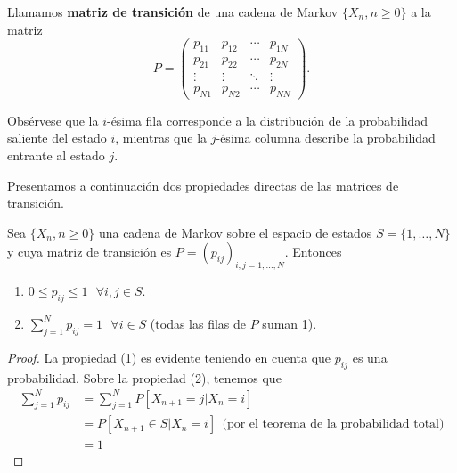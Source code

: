 \begin{definicion}
    Llamamos \textbf{matriz de transición} de una cadena de Markov $\{X_n, n\geq 0\}$ a la matriz
    \begin{equation}
        \label{eq:matriz-trans}
        P=\begin{pmatrix}
          p_{11} & p_{12} & \cdots & p_{1N} \\
          p_{21} & p_{22} & \cdots & p_{2N} \\
          \vdots & \vdots & \ddots & \vdots \\
          p_{N1} & p_{N2} & \cdots & p_{NN}  
        \end{pmatrix}.
    \end{equation}
\end{definicion}

\begin{observacion}
    Obsérvese que la $i$-ésima fila corresponde a la distribución de la probabilidad saliente del estado $i$, mientras que la $j$-ésima columna describe la probabilidad entrante al estado $j$.
\end{observacion}

Presentamos a continuación dos propiedades directas de las matrices de transición.

\begin{proposicion}
    \label{prop:propiedades-matrices-markov}
Sea $\{X_n, n\geq 0\}$ una cadena de Markov sobre el espacio de estados $S=\{1,\dots,N\}$ y cuya matriz de transición es $P=(p_{ij})_{i,j=1,\dots,N}$. Entonces
\begin{enumerate}
    \item $0\leq p_{ij} \leq 1 \ \ \ \forall i,j\in S$.
    \item $\sum_{j=1}^N p_{ij} = 1 \ \ \ \forall i\in S$ (todas las filas de $P$ suman 1).
\end{enumerate}
\end{proposicion}
\begin{proof}
    La propiedad (1) es evidente teniendo en cuenta que $p_{ij}$ es una probabilidad. Sobre la propiedad (2), tenemos que
    \begin{equation*}
        \begin{split}
            \sum_{j=1}^N p_{ij} &= \sum_{j=1}^N P[X_{n+1}=j|X_n=i] \\
            &= P[X_{n+1}\in S|X_n=i] \ \ \text{(por el teorema de la probabilidad total)} \\
            &= 1
        \end{split}
    \end{equation*}
\end{proof}

